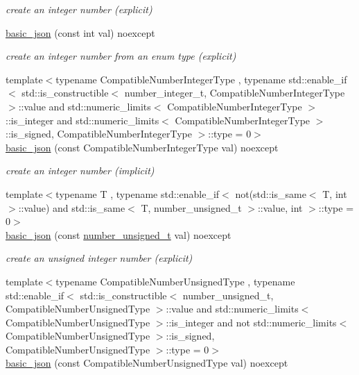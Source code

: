 \begin{DoxyCompactItemize}
\begin{DoxyCompactList}\small\item\em create an integer number (explicit) \end{DoxyCompactList}\item 
\hyperlink{classnlohmann_1_1basic__json_a70ae1f0747f5b7a89979512866474f1a}{basic\+\_\+json} (const int val) noexcept
\begin{DoxyCompactList}\small\item\em create an integer number from an enum type (explicit) \end{DoxyCompactList}\item 
{\footnotesize template$<$typename Compatible\+Number\+Integer\+Type , typename std\+::enable\+\_\+if$<$ std\+::is\+\_\+constructible$<$ number\+\_\+integer\+\_\+t, Compatible\+Number\+Integer\+Type $>$\+::value and std\+::numeric\+\_\+limits$<$ Compatible\+Number\+Integer\+Type $>$\+::is\+\_\+integer and std\+::numeric\+\_\+limits$<$ Compatible\+Number\+Integer\+Type $>$\+::is\+\_\+signed, Compatible\+Number\+Integer\+Type $>$\+::type  = 0$>$ }\\\hyperlink{classnlohmann_1_1basic__json_ad2eddc2c13ab084f067eaba65d381ad2}{basic\+\_\+json} (const Compatible\+Number\+Integer\+Type val) noexcept
\begin{DoxyCompactList}\small\item\em create an integer number (implicit) \end{DoxyCompactList}\item 
{\footnotesize template$<$typename T , typename std\+::enable\+\_\+if$<$ not(std\+::is\+\_\+same$<$ T, int $>$\+::value) and std\+::is\+\_\+same$<$ T, number\+\_\+unsigned\+\_\+t $>$\+::value, int $>$\+::type  = 0$>$ }\\\hyperlink{classnlohmann_1_1basic__json_a85b09b03916d3d1e73373f49cdd4136d}{basic\+\_\+json} (const \hyperlink{classnlohmann_1_1basic__json_a60a04166c122072ab11eaf9845d9cd1d}{number\+\_\+unsigned\+\_\+t} val) noexcept
\begin{DoxyCompactList}\small\item\em create an unsigned integer number (explicit) \end{DoxyCompactList}\item 
{\footnotesize template$<$typename Compatible\+Number\+Unsigned\+Type , typename std\+::enable\+\_\+if$<$ std\+::is\+\_\+constructible$<$ number\+\_\+unsigned\+\_\+t, Compatible\+Number\+Unsigned\+Type $>$\+::value and std\+::numeric\+\_\+limits$<$ Compatible\+Number\+Unsigned\+Type $>$\+::is\+\_\+integer and not std\+::numeric\+\_\+limits$<$ Compatible\+Number\+Unsigned\+Type $>$\+::is\+\_\+signed, Compatible\+Number\+Unsigned\+Type $>$\+::type  = 0$>$ }\\\hyperlink{classnlohmann_1_1basic__json_a68a5f34b164a07b8ced13fcf2b7ec834}{basic\+\_\+json} (const Compatible\+Number\+Unsigned\+Type val) noexcept

\end{DoxyCompactItemize}
